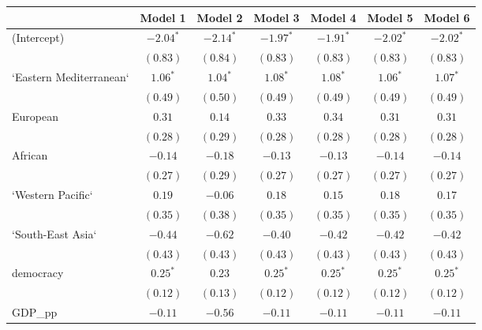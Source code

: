 
\begin{table}[!h]
\begin{center}
\begin{tabular}{l c c c c c c }
\toprule
 & Model 1 & Model 2 & Model 3 & Model 4 & Model 5 & Model 6 \\
\midrule
(Intercept)             & $-2.04^{*}$  & $-2.14^{*}$  & $-1.97^{*}$  & $-1.91^{*}$  & $-2.02^{*}$  & $-2.02^{*}$  \\
                        & $(0.83)$     & $(0.84)$     & $(0.83)$     & $(0.83)$     & $(0.83)$     & $(0.83)$     \\
`Eastern Mediterranean` & $1.06^{*}$   & $1.04^{*}$   & $1.08^{*}$   & $1.08^{*}$   & $1.06^{*}$   & $1.07^{*}$   \\
                        & $(0.49)$     & $(0.50)$     & $(0.49)$     & $(0.49)$     & $(0.49)$     & $(0.49)$     \\
European                & $0.31$       & $0.14$       & $0.33$       & $0.34$       & $0.31$       & $0.31$       \\
                        & $(0.28)$     & $(0.29)$     & $(0.28)$     & $(0.28)$     & $(0.28)$     & $(0.28)$     \\
African                 & $-0.14$      & $-0.18$      & $-0.13$      & $-0.13$      & $-0.14$      & $-0.14$      \\
                        & $(0.27)$     & $(0.29)$     & $(0.27)$     & $(0.27)$     & $(0.27)$     & $(0.27)$     \\
`Western Pacific`       & $0.19$       & $-0.06$      & $0.18$       & $0.15$       & $0.18$       & $0.17$       \\
                        & $(0.35)$     & $(0.38)$     & $(0.35)$     & $(0.35)$     & $(0.35)$     & $(0.35)$     \\
`South-East Asia`       & $-0.44$      & $-0.62$      & $-0.40$      & $-0.42$      & $-0.42$      & $-0.42$      \\
                        & $(0.43)$     & $(0.43)$     & $(0.43)$     & $(0.43)$     & $(0.43)$     & $(0.43)$     \\
democracy               & $0.25^{*}$   & $0.23$       & $0.25^{*}$   & $0.25^{*}$   & $0.25^{*}$   & $0.25^{*}$   \\
                        & $(0.12)$     & $(0.13)$     & $(0.12)$     & $(0.12)$     & $(0.12)$     & $(0.12)$     \\
GDP\_pp                 & $-0.11$      & $-0.56$      & $-0.11$      & $-0.11$      & $-0.11$      & $-0.11$      \\

\end{tabular}
\end{center}
\end{table}
